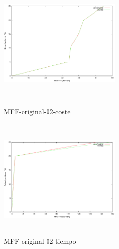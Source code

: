 \documentclass{article}
\begin{document}
\pagebreak

\begin{figure}[!htb]
   \begin{minipage}{0.48\textwidth}
     \centering
     \includegraphics[width=6cm, height=6cm]{mff-or-02-cost}
    \caption{MFF-original-02-coste}
   \end{minipage}\hfill
   \begin {minipage}{0.48\textwidth}
     \centering
     \includegraphics[width=6cm, height=6cm]{mff-or-02-time}
    \caption{MFF-original-02-tiempo}
   \end{minipage}
\end{figure}
\end{document}
